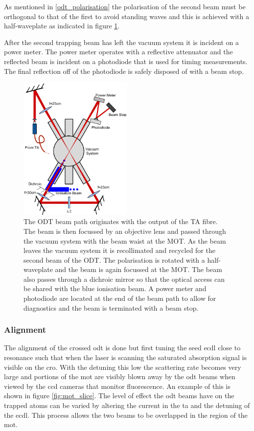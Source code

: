 As mentioned in \ref{odt_polarisation} the polarisation of the second beam must be orthogonal to that of the first to avoid standing waves and this is achieved with a half-waveplate as indicated in figure \ref{fig:dipole_rig}.

After the second trapping beam has left the vacuum system it is incident on a power meter. The power meter operates with a reflective attenuator and the reflected beam is incident on a photodiode that is used for timing measurements. The final reflection off of the photodiode is safely disposed of with a beam stop.

\begin{figure}[h]
\centering
\includegraphics[width=0.5\textwidth]{figs/DipoleTrapRig.pdf}
\caption{The ODT beam path originates with the output of the TA fibre. The beam is then focussed by an objective lens and passed through the vacuum system with the beam waist at the MOT. As the beam leaves the vacuum system it is recollimated and recycled for the second beam of the ODT. The polarisation is rotated with a half-waveplate and the beam is again focussed at the MOT. The beam also passes through a dichroic mirror so that the optical access can be shared with the blue ionisation beam. A power meter and photodiode are located at the end of the beam path to allow for diagnostics and the beam is terminated with a beam stop.}
\label{fig:dipole_rig}
\end{figure}

\subsubsection{Alignment}

The alignment of the crossed \gls{odt} is done but first tuning the seed \gls{ecdl} close to resonance such that when the laser is scanning the saturated absorption signal is visible on the \gls{cro}. With the detuning this low the scattering rate becomes very large and portions of the \gls{mot} are visibly blown away by the \gls{odt} beams when viewed by the \gls{ccd} cameras that monitor fluorescence. An example of this is shown in figure \ref{fig:mot_slice}. The level of effect the \gls{odt} beams have on the trapped atoms can be varied by altering the current in the \gls{ta} and the detuning of the \gls{ecdl}. This process allows the two beams to be overlapped in the region of the \gls{mot}.

